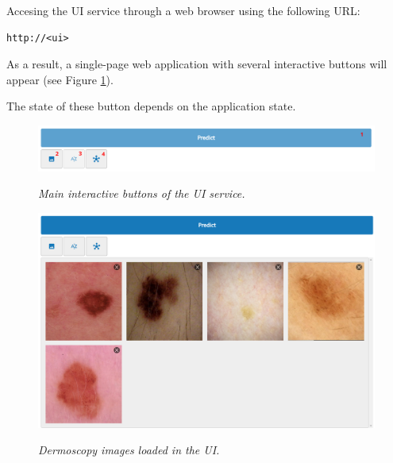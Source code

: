 \documentclass[dvipsnames,mathserif]{beamer}
\begin{document}
{\begin{frame}[fragile]
      \footnotesize
      Accesing the UI service through a web browser using the following URL:

      \vspace{0.1cm}

      \begin{Verbatim}[fontsize=\tiny]
http://<ui>
      \end{Verbatim}

      As a result, a single-page web application with several interactive buttons will appear (see Figure \ref{fig:ui-tools}).

      \vspace{0.2cm}
      The state of these button depends on the application state.


      \begin{figure}[H]
        \centering
        \includegraphics[width=\textwidth]{images/ui-tools.png}
        \caption[Main interactive buttons of the UI service]{\textit{Main interactive buttons of the UI service.}}
        {\label{fig:ui-tools}}
      \end{figure}

    \end{frame}


    \begin{frame}

      \begin{figure}[H]
        \centering
        \begin{adjustbox}{width=0.55\textwidth, trim={0cm 2.8cm 0cm 0cm}, clip}
          \includegraphics[width=\textwidth]{images/loaded-images.png}
        \end{adjustbox}
        \caption[Dermoscopy images loaded in the UI]{\footnotesize{\textit{Dermoscopy images
        loaded in the UI.}}}
        {\label{fig:loaded-images}}


\end{figure}
\end{frame}}
\end{document}
